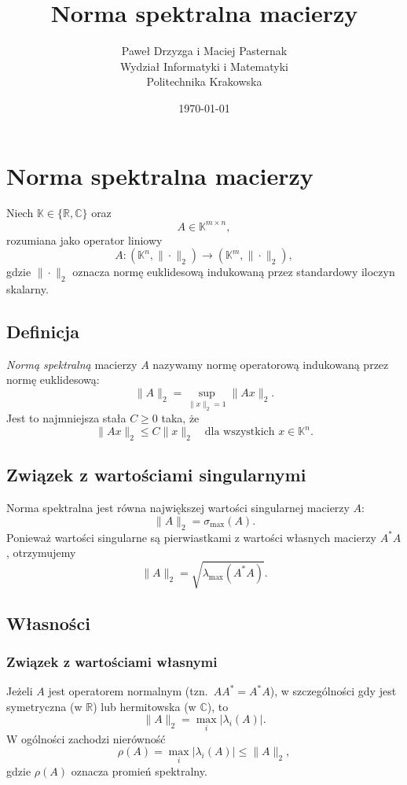 \documentclass[10pt,a4paper]{article}
\title{Norma spektralna macierzy}
\author{Paweł Drzyzga i Maciej Pasternak\\ Wydział Informatyki i Matematyki \\ Politechnika Krakowska}
\date{\today}
\begin{document}
\maketitle

\section{Norma spektralna macierzy}

Niech $\mathbb{K}\in\{\mathbb{R},\mathbb{C}\}$ oraz
\[
A\in \mathbb{K}^{m\times n},
\]
rozumiana jako operator liniowy
\[
A:(\mathbb{K}^n,\|\cdot\|_2)\longrightarrow(\mathbb{K}^m,\|\cdot\|_2),
\]
gdzie $\|\cdot\|_2$ oznacza normę euklidesową indukowaną przez standardowy iloczyn skalarny.

\subsection{Definicja}

\emph{Normą spektralną} macierzy $A$ nazywamy normę operatorową indukowaną przez normę euklidesową:
\[
\|A\|_2
=
\sup_{\|x\|_2=1}\|Ax\|_2.
\]
Jest to najmniejsza stała $C\ge 0$ taka, że
\[
\|Ax\|_2\le C\|x\|_2
\quad
\text{dla wszystkich }x\in\mathbb{K}^n.
\]

\subsection{Związek z wartościami singularnymi}

Norma spektralna jest równa największej wartości singularnej macierzy $A$:
\[
\|A\|_2=\sigma_{\max}(A).
\]
Ponieważ wartości singularne są pierwiastkami z wartości własnych macierzy $A^*A$, otrzymujemy
\[
\|A\|_2=\sqrt{\lambda_{\max}(A^*A)}.
\]

\subsection{Własności}

\subsubsection{Związek z wartościami własnymi}

Jeżeli $A$ jest operatorem normalnym (tzn.\ $AA^*=A^*A$), w szczególności gdy jest symetryczna (w $\mathbb{R}$) lub hermitowska (w $\mathbb{C}$), to
\[
\|A\|_2=\max_i|\lambda_i(A)|.
\]
W ogólności zachodzi nierówność
\[
\rho(A)=\max_i|\lambda_i(A)|\le\|A\|_2,
\]
gdzie $\rho(A)$ oznacza promień spektralny.
\end{document}
